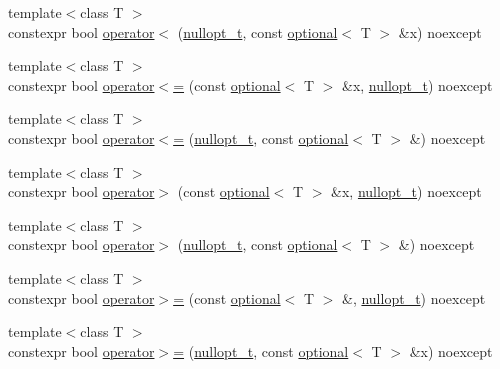 \begin{DoxyCompactItemize}
\item 
{\footnotesize template$<$class T $>$ }\\constexpr bool \mbox{\hyperlink{namespacestd_1_1experimental_a419ed2da725cc9c030f5d741a1f13d50}{operator$<$}} (\mbox{\hyperlink{structstd_1_1experimental_1_1nullopt__t}{nullopt\+\_\+t}}, const \mbox{\hyperlink{classstd_1_1experimental_1_1optional}{optional}}$<$ T $>$ \&x) noexcept
\item 
{\footnotesize template$<$class T $>$ }\\constexpr bool \mbox{\hyperlink{namespacestd_1_1experimental_a2130b2ce528946a4ef4e56f80d823267}{operator$<$=}} (const \mbox{\hyperlink{classstd_1_1experimental_1_1optional}{optional}}$<$ T $>$ \&x, \mbox{\hyperlink{structstd_1_1experimental_1_1nullopt__t}{nullopt\+\_\+t}}) noexcept
\item 
{\footnotesize template$<$class T $>$ }\\constexpr bool \mbox{\hyperlink{namespacestd_1_1experimental_ae72fae9caf85b2dff2e94ebd29371937}{operator$<$=}} (\mbox{\hyperlink{structstd_1_1experimental_1_1nullopt__t}{nullopt\+\_\+t}}, const \mbox{\hyperlink{classstd_1_1experimental_1_1optional}{optional}}$<$ T $>$ \&) noexcept
\item 
{\footnotesize template$<$class T $>$ }\\constexpr bool \mbox{\hyperlink{namespacestd_1_1experimental_ab0139892916a389ed15c89675d5512ac}{operator$>$}} (const \mbox{\hyperlink{classstd_1_1experimental_1_1optional}{optional}}$<$ T $>$ \&x, \mbox{\hyperlink{structstd_1_1experimental_1_1nullopt__t}{nullopt\+\_\+t}}) noexcept
\item 
{\footnotesize template$<$class T $>$ }\\constexpr bool \mbox{\hyperlink{namespacestd_1_1experimental_a02002e302d09fd9596aadd26a38043c0}{operator$>$}} (\mbox{\hyperlink{structstd_1_1experimental_1_1nullopt__t}{nullopt\+\_\+t}}, const \mbox{\hyperlink{classstd_1_1experimental_1_1optional}{optional}}$<$ T $>$ \&) noexcept
\item 
{\footnotesize template$<$class T $>$ }\\constexpr bool \mbox{\hyperlink{namespacestd_1_1experimental_a35cdc6a5b56b8db5690f4035242332a0}{operator$>$=}} (const \mbox{\hyperlink{classstd_1_1experimental_1_1optional}{optional}}$<$ T $>$ \&, \mbox{\hyperlink{structstd_1_1experimental_1_1nullopt__t}{nullopt\+\_\+t}}) noexcept
\item 
{\footnotesize template$<$class T $>$ }\\constexpr bool \mbox{\hyperlink{namespacestd_1_1experimental_aec1ef0d119fb9270b05212cea79a0fe0}{operator$>$=}} (\mbox{\hyperlink{structstd_1_1experimental_1_1nullopt__t}{nullopt\+\_\+t}}, const \mbox{\hyperlink{classstd_1_1experimental_1_1optional}{optional}}$<$ T $>$ \&x) noexcept

\end{DoxyCompactItemize}
